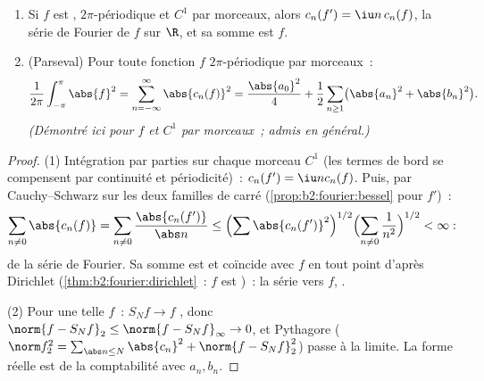 \begin{theorem}\label{thm:b2:fourier:parseval}
\begin{enumerate}
  \item Si $f$ est , $2\pi$-périodique et $C^1$ par
        morceaux, alors $c_n(f') = \iu n\,c_n(f)$, la série de
        Fourier de $f$  \emph{} sur $\R$, et sa
        somme est $f$.
  \item (Parseval) Pour toute fonction $f$ $2\pi$-périodique
         par morceaux~:
        \[
        \frac{1}{2\pi}\int_{-\pi}^{\pi}\abs{f}^2
        = \sum_{n=-\infty}^{\infty} \abs{c_n(f)}^2
        = \frac{\abs{a_0}^2}{4} + \frac12\sum_{n\geq1}
        \bigl(\abs{a_n}^2 + \abs{b_n}^2\bigr).
        \]
        \emph{(Démontré ici pour $f$  et $C^1$ par
        morceaux~; admis en général.)}
\end{enumerate}
\end{theorem}

\begin{proof}
(1) Intégration par parties sur chaque morceau $C^1$ (les termes de
bord se compensent par continuité et périodicité)~: $c_n(f') = \iu n
c_n(f)$. Puis, par Cauchy--Schwarz sur les deux familles de carré
 (\cref{prop:b2:fourier:bessel} pour $f'$)~:
\[
\sum_{n \neq 0} \abs{c_n(f)} = \sum_{n\neq0}
\frac{\abs{c_n(f')}}{\abs n}
\leq \Bigl(\sum \abs{c_n(f')}^2\Bigr)^{1/2}
\Bigl(\sum_{n\neq0}\frac{1}{n^2}\Bigr)^{1/2} < \infty :
\]
 de la série de Fourier. Sa somme est  et
coïncide avec $f$ en tout point d'après Dirichlet
(\cref{thm:b2:fourier:dirichlet}~: $f$ est )~: la série
 vers $f$, .

(2) Pour une telle $f$~: $S_N f \to f$ , donc $\norm{f -
S_Nf}_2 \leq \norm{f - S_Nf}_\infty \to 0$, et Pythagore
($\norm f_2^2 = \sum_{\abs n \leq N}\abs{c_n}^2 + \norm{f -
S_Nf}_2^2$) passe à la limite. La forme réelle est de la
comptabilité avec $a_n, b_n$.
\end{proof}


